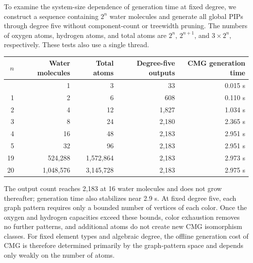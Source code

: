 To examine the system-size dependence of generation time at fixed degree, we construct a sequence containing \(2^n\) water molecules and generate all global PIPs through degree five without component-count or treewidth pruning.
The numbers of oxygen atoms, hydrogen atoms, and total atoms are \(2^n\), \(2^{n+1}\), and \(3\times2^n\), respectively. These tests also use a single thread.

\begingroup
\small
\setlength{\tabcolsep}{4pt}
\begin{longtable}[]{@{}rrrrr@{}}
\toprule\noalign{}
\(n\) & Water molecules & Total atoms & Degree-five outputs & CMG generation time \\
\midrule\noalign{}
\endhead
\bottomrule\noalign{}
\endlastfoot
0 & 1 & 3 & 33 & 0.015 s \\
1 & 2 & 6 & 608 & 0.110 s \\
2 & 4 & 12 & 1,827 & 1.034 s \\
3 & 8 & 24 & 2,180 & 2.365 s \\
4 & 16 & 48 & 2,183 & 2.951 s \\
5 & 32 & 96 & 2,183 & 2.951 s \\
19 & 524,288 & 1,572,864 & 2,183 & 2.973 s \\
20 & 1,048,576 & 3,145,728 & 2,183 & 2.975 s \\
\end{longtable}
\endgroup

The output count reaches 2,183 at 16 water molecules and does not grow thereafter; generation time also stabilizes near 2.9 s.
At fixed degree five, each graph pattern requires only a bounded number of vertices of each color. Once the oxygen and hydrogen capacities exceed these bounds, color exhaustion removes no further patterns, and additional atoms do not create new CMG isomorphism classes.
For fixed element types and algebraic degree, the offline generation cost of CMG is therefore determined primarily by the graph-pattern space and depends only weakly on the number of atoms.

